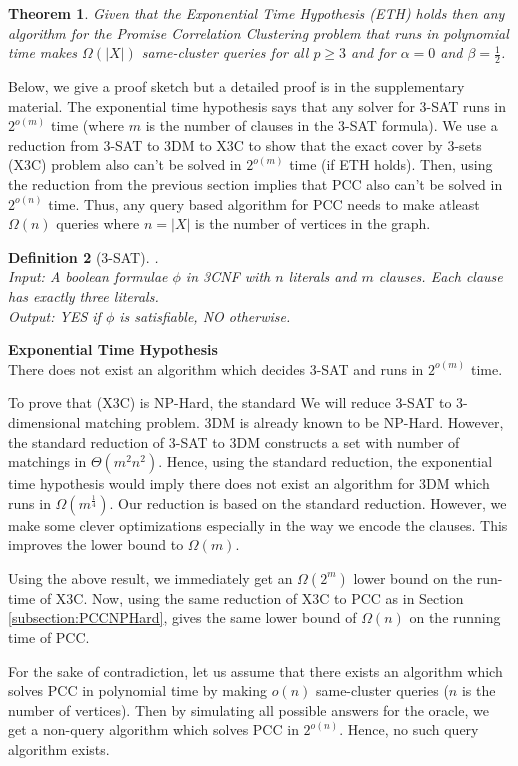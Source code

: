 \documentclass[12pt]{article}
\newtheorem{theorem}{Theorem}
\newtheorem{definition}[theorem]{Definition}
\begin{document}
\begin{theorem}
Given that the Exponential Time Hypothesis (ETH) holds then any algorithm for the Promise Correlation Clustering problem  that runs in polynomial time makes $\Omega(|X|)$ same-cluster queries for all $p \ge 3$ and for $\alpha = 0$ and $\beta = \frac{1}{2}$. 
\end{theorem}

\noindent Below, we give a proof sketch but a detailed proof is in the supplementary material. The exponential time hypothesis says that any solver for $3$-SAT runs in $2^{o(m)}$ time (where $m$ is the number of clauses in the $3$-SAT formula). We use a reduction from $3$-SAT to 3DM to X3C to show that the exact cover by 3-sets (X3C) problem also can't be solved in $2^{o(m)}$ time (if ETH holds). Then, using the reduction from the previous section implies that PCC also can't be solved in $2^{o(n)}$ time. Thus, any query based algorithm for PCC needs to make atleast $\Omega(n)$ queries where $n = |X|$ is the number of vertices in the graph. 

\begin{definition}[3-SAT].\\
Input: A boolean formulae $\phi$ in 3CNF with $n$ literals and $m$ clauses. Each clause has exactly three literals. \\
Output: YES if $\phi$ is satisfiable, NO otherwise. 
\end{definition}

\noindent\textbf{Exponential Time Hypothesis}\\
There does not exist an algorithm which decides 3-SAT  and runs in $2^{o(m)}$ time.

\noindent To prove that (X3C) is NP-Hard, the standard We will reduce 3-SAT to 3-dimensional matching problem. 3DM is already known to be NP-Hard. However, the standard reduction of 3-SAT to 3DM constructs a set with number of matchings in $\Theta(m^2 n^2)$. Hence, using the standard reduction, the exponential time hypothesis would imply there does not exist an algorithm for 3DM which runs in $\Omega(m^\frac{1}{4})$. Our reduction is based on the standard reduction. However, we make some clever optimizations especially in the way we encode the clauses. This improves the lower bound to $\Omega(m)$.

Using the above result, we immediately get an $\Omega(2^m)$ lower bound on the run-time of X3C. Now, using the same reduction of X3C to PCC as in Section \ref{subsection:PCCNPHard}, gives the same lower bound of $\Omega(n)$ on the running time of PCC. 

For the sake of contradiction, let us assume that there exists an algorithm which solves PCC in polynomial time by making $o(n)$ same-cluster queries ($n$ is the number of vertices). Then by simulating all possible answers for the oracle, we get a non-query algorithm which solves PCC in $2^{o(n)}$. Hence, no such query algorithm exists. 

\ifdefined\COMPLETE
\else
\end{document}
